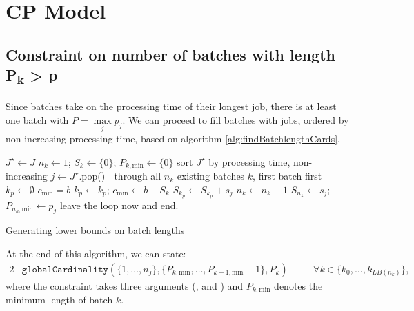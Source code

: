 \section{CP Model}
\subsection[Constraint on the number of batches with length $P_k >
p$]{Constraint on number of batches with length {\sansitalicfont
P\textsubscript{k}} > {\sansitalicfont p}}

Since batches take on the processing time of their longest job, there is at
least one batch with $P = \underset{j}{\max} p_j $. We can proceed to fill batches with jobs, ordered by non-increasing processing
time, based on algorithm \ref{alg:findBatchlengthCards}. 

\begin{algorithm}[h!]
\fontsize{9pt}{11.5pt}\selectfont \begin{algorithmic} \State $J^{\star} \gets J$
 \State $n_k \gets 1$; $S_k
\gets \{0\}$; $P_{k,\text{min}} \gets \{0\}$  \State sort $J^{\star}$ by processing time, non-increasing
\Repeat \State $j \gets J^{\star}$.pop()  \Loop $\;$ through all $n_k$ existing batches $k$, first
batch first \State $k_p \gets \emptyset$  \State
$c_\text{min} = b$   \State $k_p \gets k_p$; $c_\text{min} \gets
b-S_k$ \EndIf \EndLoop {} \State $S_{k_p} \gets S_{k_p} + s_j$
 \Else {} \State $n_k
\gets n_k + 1$ \State $S_{n_k} \gets s_j$;
$P_{n_k,\text{min}} \gets p_j$ 
\Else \State leave the loop now and end.  \EndIf \EndIf {} \end{algorithmic} \caption{Generating lower bounds on batch lengths}
\label{alg:findBatchlengthCards} \end{algorithm}
At the end of this algorithm, we can state: \begin{alignat}{2} &
\mathtt{globalCardinality}(\{1,\dots,n_j\},
\{P_{k,\text{min}}, \dots, P_{k-1,\text{min}} - 1\}, P_k) \quad && \forall k \in \{k_0,\dots,k_{LB(n_k)}\}, \end{alignat}
where the constraint takes three arguments (,  and ) and $P_{k,\text{min}}$ denotes the minimum length of batch $k$.


